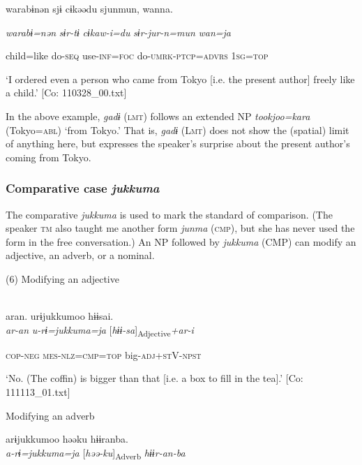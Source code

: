     warabɨnən  sjɨ  cɨkəədu  sjunmun,  wanna.

    \textit{warabɨ=nən}  \textit{sɨr-tɨ}  \textit{cɨkaw-i=du}  \textit{sɨr-jur-n=mun}  \textit{wan=ja}

    child=like  do-\textsc{seq}  use-\textsc{inf}=\textsc{foc}  do-\textsc{umrk}-\textsc{ptcp}=\textsc{advrs}  1\textsc{sg}=\textsc{top}

\glt    ‘I ordered even a person who came from Tokyo [i.e. the present author] freely like a child.’ [Co: 110328\_00.txt]
\z

In the above example, \textit{gadɨ} (\textsc{lmt}) follows an extended NP \textit{tookjoo=kara} (Tokyo=\textsc{abl}) ‘from Tokyo.’ That is, \textit{gadɨ} (L\textsc{mt}) does not show the (spatial) limit of anything here, but expresses the speaker’s surprise about the present author’s coming from Tokyo.

\subsubsection{Comparative case \textit{jukkuma}}

The comparative \textit{jukkuma} is used to mark the standard of comparison. (The speaker \textsc{tm} also taught me another form \textit{junma} (\textsc{cmp}), but she has never used the form in the free conversation.) An NP followed by \textit{jukkuma} (CMP) can modify an adjective, an adverb, or a nominal.

(6)  Modifying an adjective

 \ea{}\\
\gll  {\TM}  aran.  urɨjukkumoo  hɨɨsai.\\

      \textit{ar-an}  \textit{u-rɨ=jukkuma=ja}  [\textit{hɨɨ-sa}]\textsubscript{Adjective}\textit{+ar-i}

      \textsc{cop}-\textsc{neg}  \textsc{mes}-\textsc{nlz}=\textsc{cmp}=\textsc{top}  big-\textsc{adj}+\textsc{st}V-\textsc{npst}

\glt ‘No. (The coffin) is bigger than that [i.e. a box to fill in the tea].’ [Co: 111113\_01.txt]
\z

  Modifying an adverb

 \ex {\TM}  arɨjukkumoo  həəku  hɨɨranba.\\
\gll \textit{a-rɨ=jukkuma=ja}  [\textit{həə-ku}]\textsubscript{Adverb}  \textit{hɨɨr-an-ba}\\

